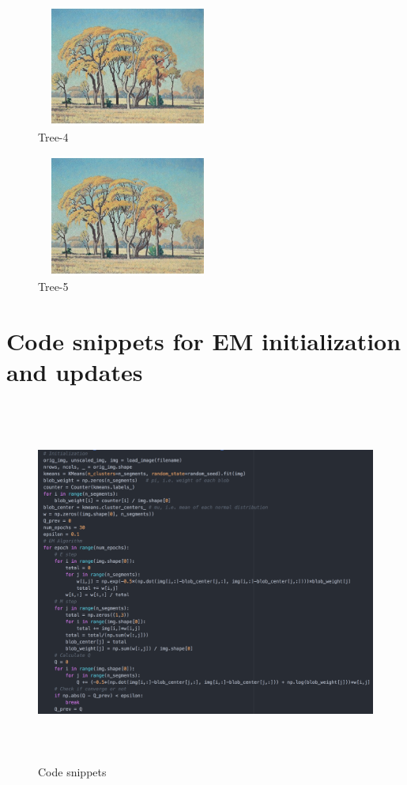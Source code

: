 \documentclass[a4paper, 11pt]{article}
\begin{document}
\begin{figure}[h!]
\centering
    \includegraphics[width=6cm, height=4cm]{images/Tree_20_3.jpeg}
    \caption{Tree-4}
\end{figure}\begin{figure}[h!]
\centering
    \includegraphics[width=6cm, height=4cm]{images/Tree_20_4.jpeg}
    \caption{Tree-5}
\end{figure}


\section{Code snippets for EM initialization and updates}
\begin{figure}[h!]
\centering
    \includegraphics[width=17cm, height=12cm]{images/code.jpeg}
    \caption{Code snippets}
\end{figure}
\end{document}

